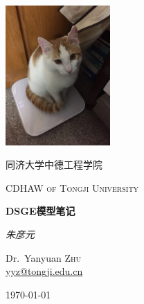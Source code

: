 \begin{titlepage}
  \centering
  \includegraphics[width=0.3\textwidth]{./Figures/Prof-Miew.jpg}\par\vspace{1cm}
  {\LARGE 同济大学中德工程学院 \par}
  \vspace{1cm}
  {\scshape\Large CDHAW of Tongji University\par}
  \vspace{1.5cm}
  {\huge\bfseries DSGE模型笔记\par}
  \vspace{2cm}
  {\Large\itshape 朱彦元\par}
  \vfill
  Dr.~Yanyuan \textsc{Zhu} \\
  \href{mailto:yyz@tongji.edu.cn}{yyz@tongji.edu.cn}
  \vfill

  {\large \today\par}
\end{titlepage}
